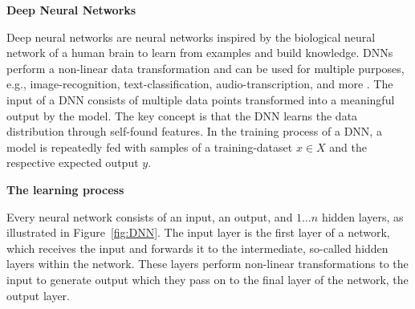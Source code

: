 \textbf{Deep Neural Networks}

Deep neural networks are neural networks inspired by the biological neural network of a human brain to learn from examples and build knowledge. 
DNNs perform a non-linear data transformation and can be used for multiple purposes, e.g., image-recognition, text-classification, audio-transcription, and more \cite{rawat2017deep}.
The input of a DNN consists of multiple data points transformed into a meaningful output by the model. The key concept is that the DNN learns the data distribution through self-found features.
In the training process of a DNN, a model is repeatedly fed with samples of a training-dataset $x \in X$ and the respective expected output $y$.

\textbf{The learning process}

Every neural network consists of an input, an output, and $1\dots n$ hidden layers, as illustrated in Figure~\ref{fig:DNN}.
The input layer is the first layer of a network, which receives the input and forwards it to the intermediate, so-called hidden layers within the network. These layers perform non-linear transformations to the input to generate output which they pass on to the final layer of the network, the output layer. 
